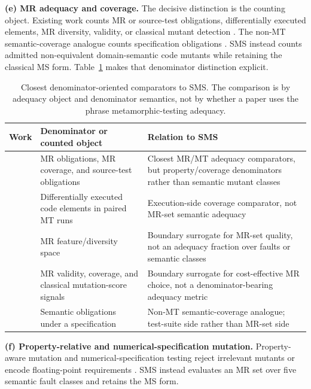 \documentclass[manuscript,screen,review]{acmart}
\begin{document}
\textbf{(e) MR adequacy and coverage.} The decisive distinction is the
counting object. Existing work counts MR or source-test obligations,
differentially executed elements, MR diversity, validity, or classical
mutant detection
\citep{xiang2019compositeMR,fu2024mtadequacy,liu2024mtcoverage,ba2025metamorphiccoverage,xie2024mutmodel,huang2022mrprioritization,zhang2022effectivemrselection}.
The non-MT semantic-coverage analogue counts specification obligations
\citep{302e9d254f138148abce2feda1319f9cb32cd914}. SMS instead counts
admitted non-equivalent domain-semantic code mutants while retaining the
classical MS form.
Table~\ref{tab:closest-denominator-comparators} makes that denominator
distinction explicit.

\begin{table}[t]
\centering
\footnotesize
\caption{Closest denominator-oriented comparators to SMS. The comparison
is by adequacy object and denominator semantics, not by whether a paper
uses the phrase metamorphic-testing adequacy.}
\label{tab:closest-denominator-comparators}
\begin{tabular}{p{}p{}p{}}
\toprule
Work & Denominator or counted object & Relation to SMS \\
\midrule
\citep{fu2024mtadequacy,liu2024mtcoverage} & MR obligations, MR coverage, and source-test obligations & Closest MR/MT adequacy comparators, but property/coverage denominators rather than semantic mutant classes \\
\citep{ba2025metamorphiccoverage} & Differentially executed code elements in paired MT runs & Execution-side coverage comparator, not MR-set semantic adequacy \\
\citep{xie2024mutmodel} & MR feature/diversity space & Boundary surrogate for MR-set quality, not an adequacy fraction over faults or semantic classes \\
\citep{huang2022mrprioritization,zhang2022effectivemrselection} & MR validity, coverage, and classical mutation-score signals & Boundary surrogate for cost-effective MR choice, not a denominator-bearing adequacy metric \\
\citep{302e9d254f138148abce2feda1319f9cb32cd914} & Semantic obligations under a specification & Non-MT semantic-coverage analogue; test-suite side rather than MR-set side \\
\bottomrule
\end{tabular}
\end{table}

\textbf{(f) Property-relative and numerical-specification mutation.}
Property-aware mutation and numerical-specification testing reject
irrelevant mutants or encode floating-point requirements
\citep{0ed19a2ecb5537dbf1c5f25a818f45a34d418ae8,525d0597f3b46f6b8dc6e0ee1e0cd507d23dc22b}.
SMS instead evaluates an MR set over five semantic fault classes and
retains the MS form.
\end{document}
